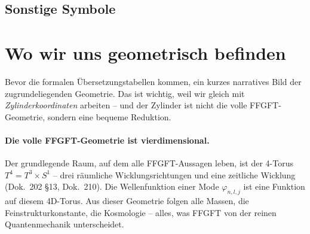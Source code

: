 \subsection*{Sonstige Symbole}

\begin{center}
\renewcommand{\arraystretch}{1.3}
{\small
{}
}
\renewcommand{\arraystretch}{1.0}
\end{center}

\section*{Wo wir uns geometrisch befinden}

Bevor die formalen Übersetzungstabellen kommen, ein kurzes
narratives Bild der zugrundeliegenden Geometrie. Das ist wichtig,
weil wir gleich mit \emph{Zylinderkoordinaten} arbeiten -- und der
Zylinder ist nicht die volle FFGFT-Geometrie, sondern eine
bequeme Reduktion.

\paragraph{Die volle FFGFT-Geometrie ist vierdimensional.}
Der grundlegende Raum, auf dem alle FFGFT-Aussagen leben, ist der
4-Torus $T^4 = T^3 \times S^1$ -- drei räumliche Wicklungsrichtungen
und eine zeitliche Wicklung (Dok.~202 §13, Dok.~210). Die
Wellenfunktion einer Mode $\varphi_{n,l,j}$ ist eine Funktion auf
diesem 4D-Torus. Aus dieser Geometrie folgen alle Massen, die
Feinstrukturkonstante, die Kosmologie -- alles, was FFGFT von der
reinen Quantenmechanik unterscheidet.

